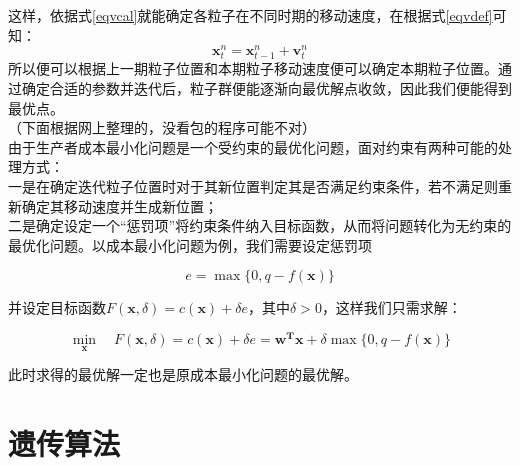 \documentclass[11pt,a4paper]{article}
\begin{document}
这样，依据式\ref{eqvcal}就能确定各粒子在不同时期的移动速度，在根据式\ref{eqvdef}可知：
\begin{equation}
    \mathbf{x}^n_{t}=\mathbf{x}^n_{t-1}+\mathbf{v}^n_{t}
\end{equation}
所以便可以根据上一期粒子位置和本期粒子移动速度便可以确定本期粒子位置。通过确定合适的参数并迭代后，粒子群便能逐渐向最优解点收敛，因此我们便能得到最优点。\\

（下面根据网上整理的，没看包的程序可能不对）\\

由于生产者成本最小化问题是一个受约束的最优化问题，面对约束有两种可能的处理方式：\\

一是在确定迭代粒子位置时对于其新位置判定其是否满足约束条件，若不满足则重新确定其移动速度并生成新位置；\\

二是确定设定一个“惩罚项”将约束条件纳入目标函数，从而将问题转化为无约束的最优化问题。以成本最小化问题为例，我们需要设定惩罚项

\begin{equation}
    e=\max\{0,q-f(\mathbf{x})\}
\end{equation}

并设定目标函数$F(\mathbf{x},\delta)=c(\mathbf{x})+\delta e$，其中$\delta >0$，这样我们只需求解：

\begin{equation}
	\min_{\mathbf{x}} \quad F(\mathbf{x},\delta)=c(\mathbf{x})+\delta e=\mathbf{w^T x}+\delta \max\{0,q-f(\mathbf{x})\}
\end{equation}

此时求得的最优解一定也是原成本最小化问题的最优解。

\section{遗传算法}
\end{document}
